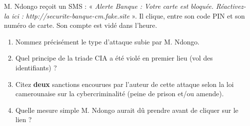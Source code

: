 \documentclass[11pt]{article}
\begin{document}
\begin{exercice}
M. Ndongo reçoit un SMS : « \textit{Alerte Banque : Votre carte est bloquée. Réactivez-la ici : http://securite-banque-cm.fake.site} ». Il clique, entre son code PIN et son numéro de carte. Son compte est vidé dans l'heure.
\begin{enumerate}
    \item Nommez précisément le type d'attaque subie par M. Ndongo.
    \item Quel principe de la triade CIA a été violé en premier lieu (vol des identifiants) ?
    \item Citez \textbf{deux} sanctions encourues par l'auteur de cette attaque selon la loi camerounaise sur la cybercriminalité (peine de prison et/ou amende).
    \item Quelle mesure simple M. Ndongo aurait dû prendre avant de cliquer sur le lien ?
\end{enumerate}
\end{exercice}
\end{document}
